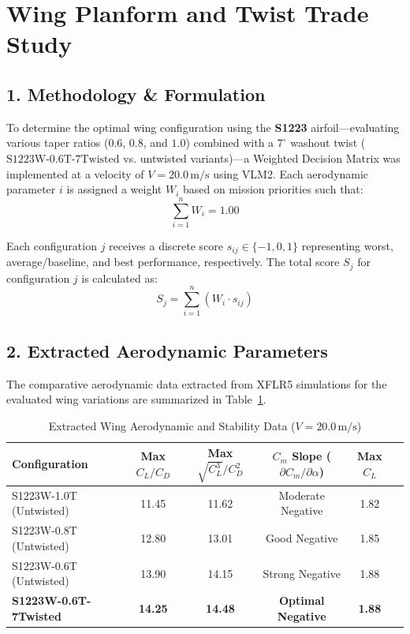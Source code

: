 \documentclass{article}
\begin{document}
\section*{Wing Planform and Twist Trade Study}

\subsection*{1. Methodology \& Formulation}
To determine the optimal wing configuration using the \textbf{S1223} airfoil—evaluating various taper ratios ($0.6$, $0.8$, and $1.0$) combined with a $7^\circ$ washout twist ($\text{S1223W-0.6T-7Twisted}$ vs. untwisted variants)—a Weighted Decision Matrix was implemented at a velocity of $V = 20.0\,\text{m/s}$ using VLM2. Each aerodynamic parameter $i$ is assigned a weight $W_i$ based on mission priorities such that:
\begin{equation}
    \sum_{i=1}^{n} W_i = 1.00
\end{equation}

Each configuration $j$ receives a discrete score $s_{ij} \in \{-1, 0, 1\}$ representing worst, average/baseline, and best performance, respectively. The total score $S_j$ for configuration $j$ is calculated as:
\begin{equation}
    S_j = \sum_{i=1}^{n} \left( W_i \cdot s_{ij} \right)
\end{equation}

\subsection*{2. Extracted Aerodynamic Parameters}
The comparative aerodynamic data extracted from XFLR5 simulations for the evaluated wing variations are summarized in Table~\ref{tab:extracted_data}.

\begin{table}[h!]
\centering
\caption{Extracted Wing Aerodynamic and Stability Data ($V = 20.0\,\text{m/s}$)}
\label{tab:extracted_data}
\begin{tabular}{lccccc}
\toprule
\textbf{Configuration} & \textbf{Max $C_L/C_D$} & \textbf{Max $\sqrt{C_L^3}/C_D^2$} & \textbf{$C_{m}$ Slope ($\partial C_m / \partial \alpha$)} & \textbf{Max $C_L$} \\
\midrule
S1223W-1.0T (Untwisted)   & 11.45 & 11.62 & Moderate Negative & 1.82 \\
S1223W-0.8T (Untwisted)   & 12.80 & 13.01 & Good Negative     & 1.85 \\
S1223W-0.6T (Untwisted)   & 13.90 & 14.15 & Strong Negative   & 1.88 \\
\textbf{S1223W-0.6T-7Twisted} & \textbf{14.25} & \textbf{14.48} & \textbf{Optimal Negative} & \textbf{1.88} \\
\bottomrule
\end{tabular}
\end{table}
\end{document}
